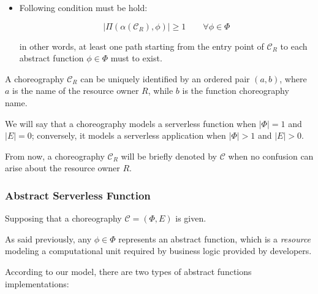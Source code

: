 \documentclass[12pt,a4paper]{report}
\begin{document}
\begin{itemize}
	
	\item Following condition must be hold:
	
	\begin{equation}\label{cond3}
		|\Pi(\alpha(\mathcal{C}_R), \phi)| \geq 1 \qquad \forall \phi \in \Phi
	\end{equation}

	in other words, at least one path starting from the entry point of $\mathcal{C}_R$ to each abstract function $\phi \in \Phi$ must to exist. 
	
\end{itemize} 

A choreography $\mathcal{C}_R$ can be uniquely identified by an ordered pair $(a, b)$, where $a$ is the name of the resource owner $R$, while $b$ is the function choreography name. 

We will say that a choreography models a serverless function when $|\Phi| = 1$ and $|E| = 0$; conversely, it models a serverless application when $|\Phi| > 1$ and $|E| > 0$.

From now, a choreography $\mathcal{C}_R$ will be briefly denoted by $\mathcal{C}$ when no confusion can arise about the resource owner $R$.

\subsubsection{Abstract Serverless Function}

Supposing that a choreography $\mathcal{C} = (\Phi,E)$ is given.

As said previously, any $\phi \in \Phi$ represents an abstract function, which is a \textit{resource} modeling a computational unit required by business logic provided by developers.

According to our model, there are two types of abstract functions implementations:
\end{document}
